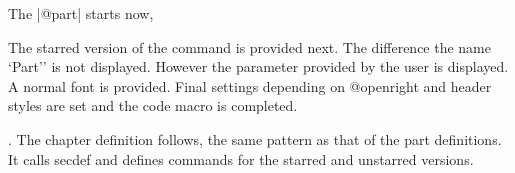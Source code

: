 The |@part| starts now,

\begin{teXXX}
\def\@part[#1]#2{%
    \ifnum \c@secnumdepth >-2\relax
      \refstepcounter{part}%
      \addcontentsline{toc}{part}{\thepart\hspace{1em}#1}%
    \else
      \addcontentsline{toc}{part}{#1}%
    \fi
    \markboth{}{}%
    {\centering
     \interlinepenalty \@M
     \normalfont
     \ifnum \c@secnumdepth >-2\relax
       \huge\bfseries \partname\nobreakspace\thepart
       \par
       \vskip 20\p@
     \fi
     \Huge \bfseries #2\par}%
    \@endpart}
\end{teXXX}

\begin{multicols}{2}
The starred version of the command is provided next. The difference the name `Part'' is not displayed. However the parameter provided by the user is displayed. A normal font is provided. Final settings depending on @openright and header styles are set and the code macro is completed.
\end{multicols}

\begin{teXXX}
\def\@spart#1{%
    {\centering
     \interlinepenalty \@M
     \normalfont
     \Huge \bfseries #1\par}%
    \@endpart}

\def\@endpart{\vfil\newpage
              \if@twoside
               \if@openright
                \null
                \thispagestyle{empty}%
                \newpage
               \fi
              \fi
              \if@tempswa
                \twocolumn
              \fi}
\end{teXXX}

\begin{multicols}{2}
. The chapter definition follows, the same pattern as that of the part definitions. It calls secdef and defines commands for the starred and unstarred versions.
\end{multicols}

\begin{teXXX}
\newcommand\chapter{\if@openright\cleardoublepage\else\clearpage\fi
                    \thispagestyle{plain}%
                    \global\@topnum\z@
                    \@afterindentfalse
                    \secdef\@chapter\@schapter}
\end{teXXX}

